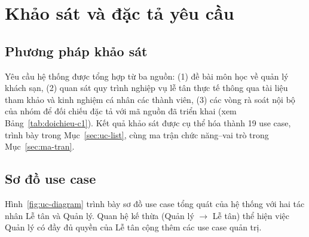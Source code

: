 \documentclass[14pt]{report}
\begin{document}

\chapter{Khảo sát và đặc tả yêu cầu}

\section{Phương pháp khảo sát}

Yêu cầu hệ thống được tổng hợp từ ba nguồn: (1) đề bài môn học về quản lý khách sạn, (2) quan sát quy trình nghiệp vụ lễ tân thực tế thông qua tài liệu tham khảo và kinh nghiệm cá nhân các thành viên, (3) các vòng rà soát nội bộ của nhóm để đối chiếu đặc tả với mã nguồn đã triển khai (xem Bảng~\ref{tab:doichieu-c1}). Kết quả khảo sát được cụ thể hóa thành 19 use case, trình bày trong Mục~\ref{sec:uc-list}, cùng ma trận chức năng--vai trò trong Mục~\ref{sec:ma-tran}.

\section{Sơ đồ use case}

Hình~\ref{fig:uc-diagram} trình bày sơ đồ use case tổng quát của hệ thống với hai tác nhân Lễ tân và Quản lý. Quan hệ kế thừa (Quản lý $\to$ Lễ tân) thể hiện việc Quản lý có đầy đủ quyền của Lễ tân cộng thêm các use case quản trị.
\end{document}
